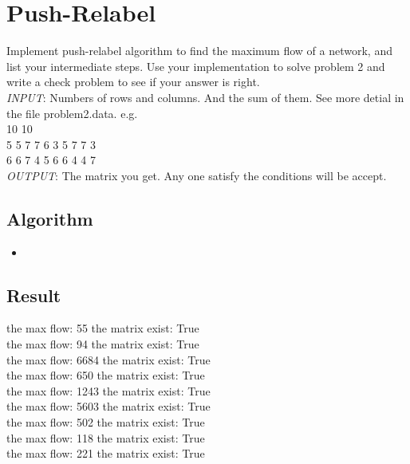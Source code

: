 \documentclass{article}
\newcommand{\pythonscript}[2]{
\begin{itemize}
\item[]
\end{itemize}
}
\numberwithin{equation}{section}
\begin{document}
\section{Push-Relabel}
Implement push-relabel algorithm to find the maximum flow of a network, and list your intermediate steps. Use your implementation to solve problem 2 and write a check problem to see if your answer is right.\\
\emph{INPUT}: Numbers of rows and columns. And the sum of them. See more detial in the file problem2.data. e.g.\\
10 10 \\
5 5 7 7 6 3 5 7 7 3 \\
6 6 7 4 5 6 6 4 4 7 \\
\emph{OUTPUT}: The matrix you get. Any one satisfy the conditions will be accept.

\subsection{Algorithm}
        \pythonscript{Push_Relabel}{Push\_Relabel Algorithm using python implement}
\subsection{Result}
        the max flow:  55  the matrix exist: True\\
        the max flow:  94  the matrix exist: True\\
        the max flow:  6684  the matrix exist: True\\
        the max flow:  650  the matrix exist: True\\
        the max flow:  1243  the matrix exist: True\\
        the max flow:  5603  the matrix exist: True\\
        the max flow:  502  the matrix exist: True\\
        the max flow:  118  the matrix exist: True\\
        the max flow:  221  the matrix exist: True\\
\end{document}
